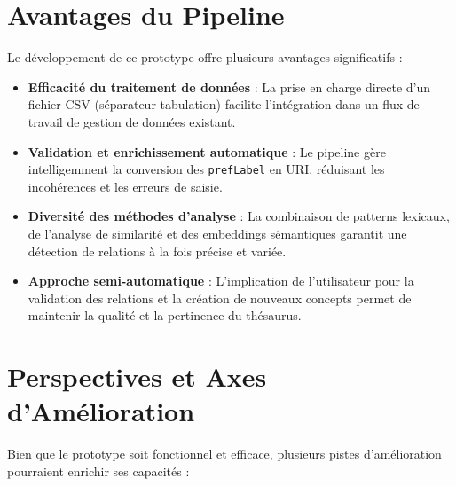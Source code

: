 \section*{Avantages du Pipeline}

Le développement de ce prototype offre plusieurs avantages significatifs :

\begin{itemize}
	\item \textbf{Efficacité du traitement de données} : La prise en charge directe d'un fichier CSV (séparateur tabulation) facilite l'intégration dans un flux de travail de gestion de données existant.
	\item \textbf{Validation et enrichissement automatique} : Le pipeline gère intelligemment la conversion des \texttt{prefLabel} en URI, réduisant les incohérences et les erreurs de saisie.
	\item \textbf{Diversité des méthodes d'analyse} : La combinaison de patterns lexicaux, de l'analyse de similarité et des embeddings sémantiques garantit une détection de relations à la fois précise et variée.
	\item \textbf{Approche semi-automatique} : L'implication de l'utilisateur pour la validation des relations et la création de nouveaux concepts permet de maintenir la qualité et la pertinence du thésaurus.
\end{itemize}

\section*{Perspectives et Axes d'Amélioration}

Bien que le prototype soit fonctionnel et efficace, plusieurs pistes d'amélioration pourraient enrichir ses capacités :

